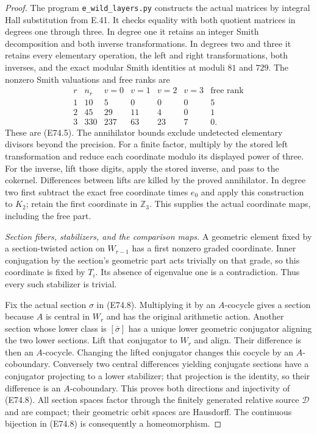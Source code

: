\begin{proof}
The program \texttt{e\_wild\_layers.py} constructs the
actual matrices by integral Hall substitution from
E.41. It checks equality with both quotient matrices
in degrees one through three. In degree one it retains
an integer Smith decomposition and both inverse
transformations. In degrees two and three it retains
every elementary operation, the left and right
transformations, both inverses, and the exact modular
Smith identities at moduli $81$ and $729$. The
nonzero Smith valuations and free ranks are
\[
 \begin{array}{c|r|rrrr|r}
 r&n_r&v=0&v=1&v=2&v=3&\text{free rank}\\\hline
 1&10&5&0&0&0&5\\
 2&45&29&11&4&0&1\\
 3&330&237&63&23&7&0.
 \end{array}
 \tag{E74.20}
\]
These are (E74.5). The annihilator bounds exclude
undetected elementary divisors beyond the precision.
For a finite factor, multiply by the stored left
transformation and reduce each coordinate modulo its
displayed power of three. For the inverse, lift those
digits, apply the stored inverse, and pass to the
cokernel. Differences between lifts are killed by
the proved annihilator. In degree two first subtract
the exact free coordinate times $e_0$ and apply this
construction to $K_2$; retain the first coordinate
in $\mathbb Z_3$. This supplies the actual coordinate
maps, including the free part.

\emph{Section fibers, stabilizers, and the comparison maps.}
A geometric element fixed by a section-twisted action
on $W_{r-1}$ has a first nonzero graded coordinate.
Inner conjugation by the section's geometric part
acts trivially on that grade, so this coordinate is
fixed by $T_i$. Its absence of eigenvalue one is a
contradiction. Thus every such stabilizer is trivial.

Fix the actual section $\sigma$ in (E74.8). Multiplying
it by an $A$-cocycle gives a section because $A$ is
central in $W_r$ and has the original arithmetic
action. Another section whose lower class is
$[\bar\sigma]$ has a unique lower geometric
conjugator aligning the two lower sections. Lift
that conjugator to $W_r$ and align. Their difference
is then an $A$-cocycle. Changing the lifted conjugator
changes this cocycle by an $A$-coboundary. Conversely
two central differences yielding conjugate sections
have a conjugator projecting to a lower stabilizer;
that projection is the identity, so their difference
is an $A$-coboundary. This proves both directions
and injectivity of (E74.8). All section spaces factor
through the finitely generated relative source
$\mathcal D$ and are compact; their geometric orbit
spaces are Hausdorff. The continuous bijection in
(E74.8) is consequently a homeomorphism.


\end{proof}
